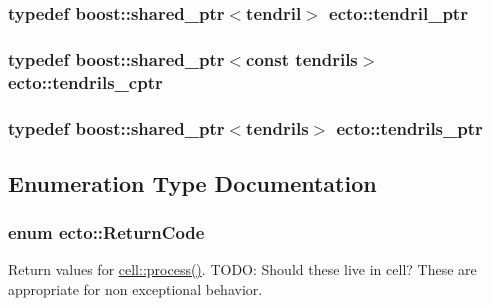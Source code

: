 \hypertarget{namespaceecto_a84fb5f6130275382e5cbeb5fdececa78}{
\subsubsection[{tendril\-\_\-ptr}]{\setlength{\rightskip}{0pt plus 5cm}typedef boost\-::shared\-\_\-ptr$<${\bf tendril}$>$ {\bf ecto\-::tendril\-\_\-ptr}}}\label{namespaceecto_a84fb5f6130275382e5cbeb5fdececa78}
\hypertarget{namespaceecto_a6165b23b34082cfc17104ca7e9f1b212}{
\subsubsection[{tendrils\-\_\-cptr}]{\setlength{\rightskip}{0pt plus 5cm}typedef boost\-::shared\-\_\-ptr$<$const {\bf tendrils}$>$ {\bf ecto\-::tendrils\-\_\-cptr}}}\label{namespaceecto_a6165b23b34082cfc17104ca7e9f1b212}
\hypertarget{namespaceecto_a89953a225525948cb71d5488c3c6472b}{
\subsubsection[{tendrils\-\_\-ptr}]{\setlength{\rightskip}{0pt plus 5cm}typedef boost\-::shared\-\_\-ptr$<${\bf tendrils}$>$ {\bf ecto\-::tendrils\-\_\-ptr}}}\label{namespaceecto_a89953a225525948cb71d5488c3c6472b}


\subsection{Enumeration Type Documentation}
\hypertarget{namespaceecto_a93d82cd28db695d53963fb696582762c}{
\subsubsection[{Return\-Code}]{\setlength{\rightskip}{0pt plus 5cm}enum {\bf ecto\-::\-Return\-Code}}}\label{namespaceecto_a93d82cd28db695d53963fb696582762c}


Return values for \hyperlink{structecto_1_1cell_a6b810671ee21f5dddbc1206abfb999f3}{cell\-::process()}. T\-O\-D\-O\-: Should these live in cell? These are appropriate for non exceptional behavior. 

